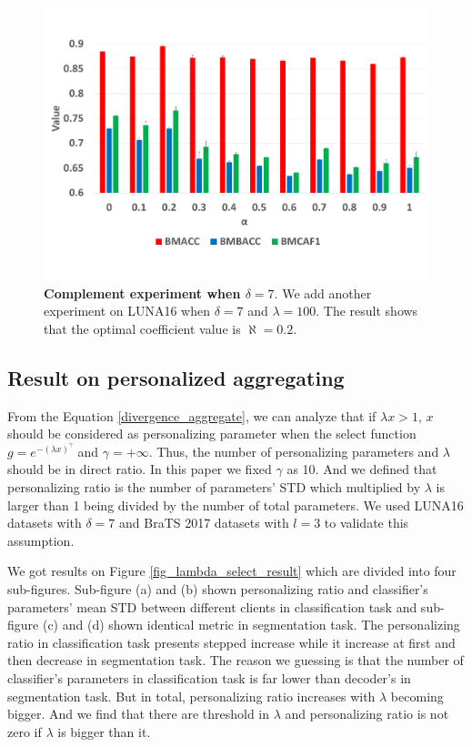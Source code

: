 \documentclass[journal]{IEEEtran}
\begin{document}
\begin{figure}
	\centering
	\includegraphics[scale=0.25]{./picture/delta7_alpha_add.pdf}
	\caption{\textbf{Complement experiment when $\delta=7$}. We add another experiment on LUNA16 when $\delta=7$ and $\lambda=100$. The result shows that the optimal coefficient value is $\aleph=0.2$.}
	\label{fig_delta7_alpha_add}
\end{figure}


\subsection{Result on personalized aggregating}
From the Equation \ref{divergence_aggregate}, we can analyze that if $\lambda x>1$, $x$ should be considered as personalizing parameter when the select function $g=e^{-(\lambda x)^{\gamma}}$ and $\gamma=+\infty$. Thus, the number of personalizing parameters and $\lambda$ should be in direct ratio. In this paper we fixed $\gamma$ as 10. And we defined that personalizing ratio is the number of parameters' STD which multiplied by $\lambda$ is larger than 1 being divided by the number of total parameters. We used LUNA16 datasets with $\delta=7$ and BraTS 2017 datasets with $l=3$ to validate this assumption.

We got results on Figure \ref{fig_lambda_select_result} which are divided into four sub-figures. Sub-figure (a) and (b) shown personalizing ratio and classifier's parameters' mean STD between different clients in classification task and sub-figure (c) and (d) shown identical metric in segmentation task. The personalizing ratio in classification task presents stepped increase while it increase at first and then decrease in segmentation task. The reason we guessing is that the number of classifier's parameters in classification task is far lower than decoder's in segmentation task. But in total, personalizing ratio increases with $\lambda$ becoming bigger. And we find that there are threshold in $\lambda$ and  personalizing ratio is not zero if $\lambda$ is bigger than it.
\end{document}

